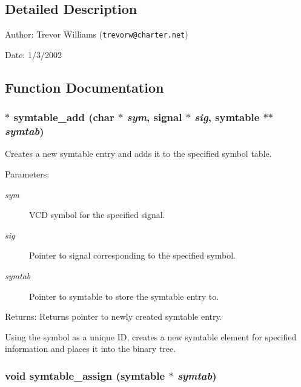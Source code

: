\subsection{Detailed Description}
\begin{Desc}
\item[Author:]Trevor Williams ({\tt trevorw@charter.net}) \end{Desc}
\begin{Desc}
\item[Date:]1/3/2002\end{Desc}


\subsection{Function Documentation}
\subsubsection{$\ast$ symtable\_\-add (char $\ast$ {\em sym}, {\bf signal} $\ast$ {\em sig}, {\bf symtable} $\ast$$\ast$ {\em symtab})}\label{symtable_8c_a0}


Creates a new symtable entry and adds it to the specified symbol table.

\begin{Desc}
\item[Parameters:]
\begin{description}
\item[{\em sym}]VCD symbol for the specified signal. \item[{\em sig}]Pointer to signal corresponding to the specified symbol. \item[{\em symtab}]Pointer to symtable to store the symtable entry to.\end{description}
\end{Desc}
\begin{Desc}
\item[Returns:]Returns pointer to newly created symtable entry.\end{Desc}
Using the symbol as a unique ID, creates a new symtable element for specified information and places it into the binary tree. 
\subsubsection{\setlength{\rightskip}{0pt plus 5cm}void symtable\_\-assign ({\bf symtable} $\ast$ {\em symtab})}\label{symtable_8c_a3}


